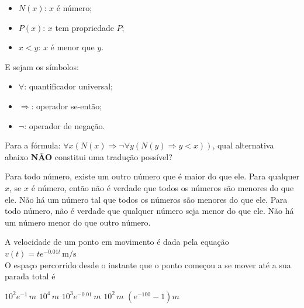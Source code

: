 \documentclass[12pt, addpoints]{exam}
\begin{document}
\begin{questions}
\begin{itemize}

    \item \( N(x) \): \( x \) é número;

    \item \( P(x) \): \( x \) tem propriedade \( P \);

    \item \( x < y \): \( x \) é menor que \( y \).

\end{itemize}



E sejam os símbolos:

\begin{itemize}

    \item \( \forall \): quantificador universal;

    \item \( \Rightarrow \): operador se-então;

    \item \( \neg \): operador de negação.

\end{itemize}



Para a fórmula: \( \forall x (N(x) \Rightarrow \neg \forall y (N(y) \Rightarrow y < x)) \), qual alternativa abaixo \textbf{NÃO} constitui uma tradução possível?


\begin{choices}
\choice Para todo número, existe um outro número que é maior do que ele.
\choice Para qualquer \( x \), se \( x \) é número, então não é verdade que todos os números são menores do que ele.
\choice Não há um número tal que todos os números são menores do que ele.
\choice Para todo número, não é verdade que qualquer número seja menor do que ele.
\choice Não há um número menor do que outro número.
\end{choices}

\question

A velocidade de um ponto em movimento é dada pela equação\\

$v(t) = t e^{-0.01t} \, \text{m/s}$\\

O espaço percorrido desde o instante que o ponto começou a se mover até a sua parada total é


\begin{choices}
\choice \( 10^2 e^{-1} \, m \)
\choice \( 10^4 \, m \)
\choice \( 10^3 e^{-0.01} \, m \)
\choice \( 10^2 \, m \)
\choice \( (e^{-100} - 1) m \)
\end{choices}


\end{questions}
\end{document}
